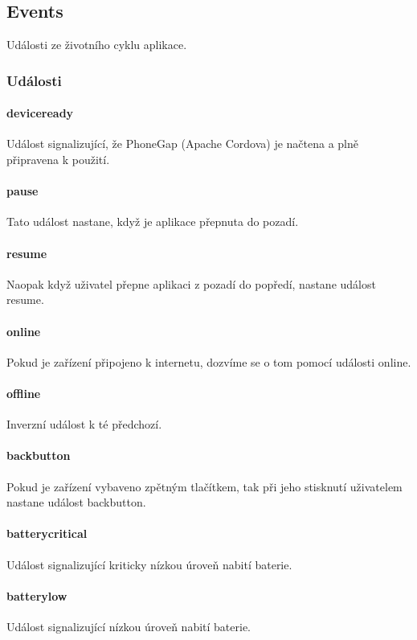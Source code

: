 \subsection{Events}
Události ze životního cyklu aplikace.

\subsubsection{Události}
\paragraph{deviceready}
Událost signalizující, že PhoneGap (Apache Cordova) je načtena a plně připravena k použití.

\paragraph{pause}
Tato událost nastane, když je aplikace přepnuta do pozadí.

\paragraph{resume}
Naopak když uživatel přepne aplikaci z pozadí do popředí, nastane událost resume.

\paragraph{online}
Pokud je zařízení připojeno k internetu, dozvíme se o tom pomocí události online.

\paragraph{offline}
Inverzní událost k té předchozí.

\paragraph{backbutton}
Pokud je zařízení vybaveno zpětným tlačítkem, tak při jeho stisknutí uživatelem nastane událost backbutton.

\paragraph{batterycritical}
Událost signalizující kriticky nízkou úroveň nabití baterie.

\paragraph{batterylow}
Událost signalizující nízkou úroveň nabití baterie.

